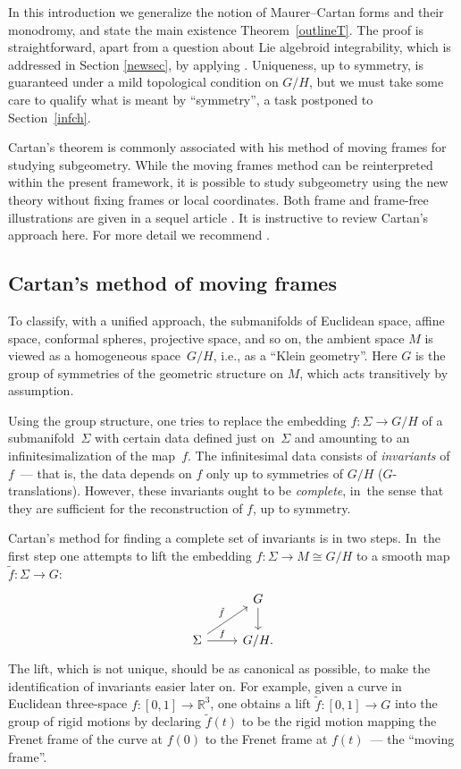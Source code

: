 \documentclass[pdftex]{sigma}%
\numberwithin{equation}{section}
\begin{document}
In this introduction we generalize the notion of Maurer--Cartan forms
and their monodromy, and state the main existence Theorem~\ref{outlineT}. The proof is straightforward, apart from a question
about Lie algebroid integrability, which is addressed in Section
\ref{newsec}, by applying \cite{Crainic_Fernandes_03}. Uniqueness, up
to symmetry, is guaranteed under a mild topological condition on
$G/H$, but we must take some care to qualify what is meant by
``symmetry'', a task postponed to Section~\ref{infch}.

Cartan's theorem is commonly associated with his method of moving
frames for studying subgeometry. While the moving frames method can
be reinterpreted within the present framework, it is possible to study
subgeometry using the new theory without fixing frames or local
coordinates. Both frame and frame-free illustrations are given in a
sequel article \cite{Blaom_G}. It is instructive to review Cartan's
approach here. For more detail we recommend \cite{Ivey_Landsberg_03}.

\subsection*{Cartan's method of moving frames}

To classify, with a unified approach, the submanifolds of Euclidean
space, affine space, conformal spheres, projective space, and so on,
the ambient space $M$ is viewed as a homogeneous space~$G/H$, i.e., as
a ``Klein geometry''. Here $G$ is the group of symmetries of the
geometric structure on $M$, which acts transitively by assumption.

Using the group structure, one tries to replace the embedding $f
\colon \Sigma \rightarrow G/H$ of a sub\-ma\-ni\-fold~$\Sigma $ with certain
data defined just on~$\Sigma $ and amounting to an
infinitesimalization of the map~$f$. The infinitesimal data consists
of {\it invariants} of $f$~--- that is, the data depends on $f$ only
up to symmetries of $G/H$ ($G$-translations). However, these
invariants ought to be {\it complete}, in~the sense that they are
sufficient for the reconstruction of $f$, up to symmetry.

Cartan's method for finding a complete set of invariants is in two
steps. In~the first step one attempts to lift the embedding $f \colon
\Sigma \rightarrow M \cong G/H$ to a smooth map $\tilde f \colon
\Sigma \rightarrow G$:
\[
 \begin{tikzcd} {}& G \arrow{d}\\ \Sigma \arrow{ur}{\tilde f}
\arrow{r}{f} & G/H.
 \end{tikzcd}
\]
The lift, which is not unique, should be as canonical as possible,
to make the identification of invariants easier later on. For
example, given a curve in Euclidean three-space $f \colon [0,1]
\rightarrow {\mathbb R}^3$, one obtains a lift $\tilde f \colon [0,1]
\rightarrow G$ into the group of rigid motions by declaring $\tilde
f(t)$ to be the rigid motion mapping the Frenet frame of the curve at
$f(0)$ to the Frenet frame at $f(t)$~--- the ``moving frame''.
\end{document}
